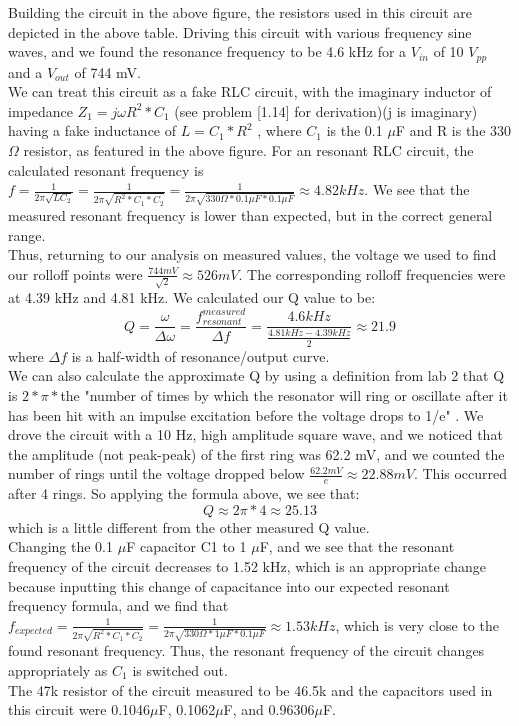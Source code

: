 \documentclass{article}
\begin{document}
    Building the circuit in the above figure, the resistors used in this circuit are depicted in the above table. Driving this circuit with various frequency sine waves, and we found the resonance frequency to be 4.6 kHz for a $V_{in}$ of 10 $V_{pp}$ and a $V_{out}$ of 744 mV.\\\indent We can treat this circuit as a fake RLC circuit, with the imaginary inductor of impedance $Z_1 = j\omega R^{2}*C_1$ (see problem [1.14] for derivation)(j is imaginary) having a fake inductance of $L = C_1 * R^{2}$ \cite{lab7}, where $C_1$ is the 0.1 $\mu$F and R is the 330$\Omega$ resistor, as featured in the above figure. For an resonant RLC circuit, the calculated resonant frequency is $f = \frac{1}{2\pi \sqrt{LC_2}} = \frac{1}{2\pi \sqrt{R^{2}*C_1*C_2}} = \frac{1}{2\pi \sqrt{330\Omega*0.1\mu F*0.1\mu F}} \approx 4.82 kHz$. We see that the measured resonant frequency is lower than expected, but in the correct general range.\\\indent Thus, returning to our analysis on measured values, the voltage we used to find our rolloff points were $\frac{744mV}{\sqrt{2}} \approx 526 mV$. The corresponding rolloff frequencies were at 4.39 kHz and 4.81 kHz. We calculated our Q value to be:
    \begin{equation}
        Q = \frac{\omega}{\Delta \omega} = \frac{f_{resonant}^{measured}}{\Delta f} = \frac{4.6kHz}{\frac{4.81 kHz - 4.39 kHz}{2}} \approx 21.9
    \end{equation}
    where $\Delta f$ is a half-width of resonance/output curve.\\\indent We can also calculate the approximate Q by using a definition from lab 2 that Q is $2*\pi * $the "number of times by which the resonator will ring or oscillate after it has been hit with an impulse excitation before the voltage drops to 1/e" \cite{lab2}. We drove the circuit with a 10 Hz, high amplitude square wave, and we noticed that the amplitude (not peak-peak) of the first ring was 62.2 mV, and we counted the number of rings until the voltage dropped below $\frac{62.2 mV}{e}\approx 22.88mV$. This occurred after 4 rings. So applying the formula above, we see that:
    \begin{equation}
        Q \approx 2\pi * 4 \approx 25.13
    \end{equation}
    which is a little different from the other measured Q value.\\\indent Changing the 0.1 $\mu$F capacitor C1 to 1 $\mu$F, and we see that the resonant frequency of the circuit decreases to 1.52 kHz, which is an appropriate change because inputting this change of capacitance into our expected resonant frequency formula, and we find that $f_{expected} = \frac{1}{2\pi \sqrt{R^{2}*C_1*C_2}} = \frac{1}{2\pi \sqrt{330\Omega*1\mu F*0.1\mu F}} \approx 1.53 kHz$, which is very close to the found resonant frequency. Thus, the resonant frequency of the circuit changes appropriately as $C_1$ is switched out.
    \\\indent The 47k resistor of the circuit measured to be 46.5k and the capacitors used in this circuit were 0.1046$\mu$F, 0.1062$\mu$F, and 0.96306$\mu$F.
    
\end{document}
